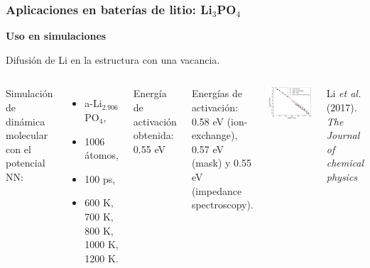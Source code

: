 \documentclass[aspectratio=169]{beamer}
\let\oldtextbf\textbf
\renewcommand{\textbf}[1]{\textcolor{nordblue}{\oldtextbf{#1}}}
\begin{document}
    \begin{frame}
        \frametitle{Aplicaciones en baterías de litio: Li$_3$PO$_4$}
            
        \textbf{Uso en simulaciones}

        Difusión de Li en la estructura con una vacancia.
        
        \begin{columns}
            Simulación de dinámica molecular con el potencial NN:
            \begin{itemize}
                \item a-Li$_{2.906}$PO$_4$,
                \item 1006 átomos,
                \item 100 ps,
                \item 600 K, 700 K, 800 K, 1000 K, 1200 K.
            \end{itemize}

            Energía de activación obtenida: 0.55 eV

            Energías de activación: 0.58 eV (ion-exchange), 0.57 eV (mask) y
            0.55 eV (impedance spectroscopy).
            \begin{center}
                \includegraphics[width=0.9\columnwidth]{Li3PO4-MD-arrhenius.png}
            \end{center}
            \tiny{Li \textit{et al.} (2017). \textit{The Journal of chemical
            physics}}
        \end{columns}

    \end{frame}
\end{document}
